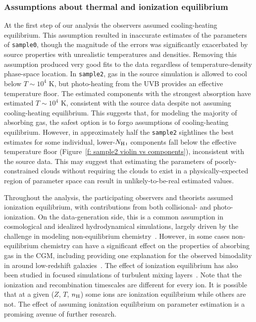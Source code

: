 \documentclass[fleqn,usenatbib]{mnras}
\begin{document}
\subsubsection{Assumptions about thermal and ionization equilibrium}

At the first step of our analysis the observers assumed cooling-heating equilibrium.
This assumption resulted in inaccurate estimates of the parameters of \texttt{sample0}, though the magnitude of the errors was significantly exacerbated by source properties with unrealistic temperatures and densities.
Removing this assumption produced very good fits to the data regardless of temperature-density phase-space location.
In \texttt{sample2}, gas in the source simulation is allowed to cool below $T \sim 10^4$ K,
but photo-heating from the UVB provides an effective temperature floor.
The estimated components with the strongest absorption have estimated $T \sim 10^4$ K,
consistent with the source data despite not assuming cooling-heating equilibrium.
This suggests that, for modeling the majority of absorbing gas, the safest option is to forgo assumptions of cooling-heating equilibrium.
However, in approximately half the \texttt{sample2} sightlines the best estimates for some individual, lower-$N_{\ion{H}{I}}$ components fall below the effective temperature floor (Figure~\ref{f: sample2 violin vs components}),
inconsistent with the source data.
This may suggest that estimating the parameters of poorly-constrained clouds without requiring the clouds to exist in a physically-expected region of parameter space can result in unlikely-to-be-real estimated values.

Throughout the analysis, the participating observers and theorists assumed ionization equilibrium, with contributions from both collisional- and photo-ionization.
On the data-generation side, this is a common assumption in cosmological and idealized hydrodynamical simulations, largely driven by the challenge in modeling non-equilibrium chemistry~\citep[e.g.][]{richings2014Nonequilibrium}.
However, in some cases non-equilibrium chemistry can have a significant effect on the properties of absorbing gas in the CGM, including providing one explanation for the observed bimodality in  around low-redshift galaxies~\citep{oppenheimer2016Bimodality}.
The effect of ionization equilibrium has also been studied in focused simulations of turbulent mixing layers~\citep[e.g.][]{ji2019Simulations}.
Note that the ionization and recombination timescales are different for every ion.
It is possible that at a given ($Z$, $T$, $n_{\rm H}$) some ions are ionization equilibrium while others are not.
The effect of assuming ionization equilibrium on parameter estimation is a promising avenue of further research.
\end{document}
